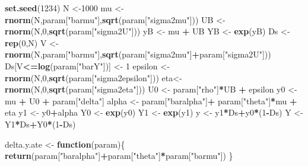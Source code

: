 \documentclass[]{book}
\newenvironment{Shaded}{\begin{snugshade}}{\end{snugshade}}
\newcommand{\ControlFlowTok}[1]{\textcolor[rgb]{0.13,0.29,0.53}{\textbf{#1}}}
\newcommand{\DecValTok}[1]{\textcolor[rgb]{0.00,0.00,0.81}{#1}}
\newcommand{\KeywordTok}[1]{\textcolor[rgb]{0.13,0.29,0.53}{\textbf{#1}}}
\newcommand{\NormalTok}[1]{#1}
\newcommand{\OperatorTok}[1]{\textcolor[rgb]{0.81,0.36,0.00}{\textbf{#1}}}
\newcommand{\StringTok}[1]{\textcolor[rgb]{0.31,0.60,0.02}{#1}}
\theoremstyle{definition}
\theoremstyle{definition}
\theoremstyle{definition}
\theoremstyle{remark}
\begin{document}
\begin{Shaded}
\begin{Highlighting}[]
\KeywordTok{set.seed}\NormalTok{(}\DecValTok{1234}\NormalTok{)}
\NormalTok{N <-}\DecValTok{1000}
\NormalTok{mu <-}\StringTok{ }\KeywordTok{rnorm}\NormalTok{(N,param[}\StringTok{"barmu"}\NormalTok{],}\KeywordTok{sqrt}\NormalTok{(param[}\StringTok{"sigma2mu"}\NormalTok{]))}
\NormalTok{UB <-}\StringTok{ }\KeywordTok{rnorm}\NormalTok{(N,}\DecValTok{0}\NormalTok{,}\KeywordTok{sqrt}\NormalTok{(param[}\StringTok{"sigma2U"}\NormalTok{]))}
\NormalTok{yB <-}\StringTok{ }\NormalTok{mu }\OperatorTok{+}\StringTok{ }\NormalTok{UB }
\NormalTok{YB <-}\StringTok{ }\KeywordTok{exp}\NormalTok{(yB)}
\NormalTok{Ds <-}\StringTok{ }\KeywordTok{rep}\NormalTok{(}\DecValTok{0}\NormalTok{,N)}
\NormalTok{V <-}\StringTok{ }\KeywordTok{rnorm}\NormalTok{(N,param[}\StringTok{"barmu"}\NormalTok{],}\KeywordTok{sqrt}\NormalTok{(param[}\StringTok{"sigma2mu"}\NormalTok{]}\OperatorTok{+}\NormalTok{param[}\StringTok{"sigma2U"}\NormalTok{]))}
\NormalTok{Ds[V}\OperatorTok{<=}\KeywordTok{log}\NormalTok{(param[}\StringTok{"barY"}\NormalTok{])] <-}\StringTok{ }\DecValTok{1} 
\NormalTok{epsilon <-}\StringTok{ }\KeywordTok{rnorm}\NormalTok{(N,}\DecValTok{0}\NormalTok{,}\KeywordTok{sqrt}\NormalTok{(param[}\StringTok{"sigma2epsilon"}\NormalTok{]))}
\NormalTok{eta<-}\StringTok{ }\KeywordTok{rnorm}\NormalTok{(N,}\DecValTok{0}\NormalTok{,}\KeywordTok{sqrt}\NormalTok{(param[}\StringTok{"sigma2eta"}\NormalTok{]))}
\NormalTok{U0 <-}\StringTok{ }\NormalTok{param[}\StringTok{"rho"}\NormalTok{]}\OperatorTok{*}\NormalTok{UB }\OperatorTok{+}\StringTok{ }\NormalTok{epsilon}
\NormalTok{y0 <-}\StringTok{ }\NormalTok{mu }\OperatorTok{+}\StringTok{  }\NormalTok{U0 }\OperatorTok{+}\StringTok{ }\NormalTok{param[}\StringTok{"delta"}\NormalTok{]}
\NormalTok{alpha <-}\StringTok{ }\NormalTok{param[}\StringTok{"baralpha"}\NormalTok{]}\OperatorTok{+}\StringTok{  }\NormalTok{param[}\StringTok{"theta"}\NormalTok{]}\OperatorTok{*}\NormalTok{mu }\OperatorTok{+}\StringTok{ }\NormalTok{eta}
\NormalTok{y1 <-}\StringTok{ }\NormalTok{y0}\OperatorTok{+}\NormalTok{alpha}
\NormalTok{Y0 <-}\StringTok{ }\KeywordTok{exp}\NormalTok{(y0)}
\NormalTok{Y1 <-}\StringTok{ }\KeywordTok{exp}\NormalTok{(y1)}
\NormalTok{y <-}\StringTok{ }\NormalTok{y1}\OperatorTok{*}\NormalTok{Ds}\OperatorTok{+}\NormalTok{y0}\OperatorTok{*}\NormalTok{(}\DecValTok{1}\OperatorTok{-}\NormalTok{Ds)}
\NormalTok{Y <-}\StringTok{ }\NormalTok{Y1}\OperatorTok{*}\NormalTok{Ds}\OperatorTok{+}\NormalTok{Y0}\OperatorTok{*}\NormalTok{(}\DecValTok{1}\OperatorTok{-}\NormalTok{Ds)}

\NormalTok{delta.y.ate <-}\StringTok{ }\ControlFlowTok{function}\NormalTok{(param)\{}
  \KeywordTok{return}\NormalTok{(param[}\StringTok{"baralpha"}\NormalTok{]}\OperatorTok{+}\NormalTok{param[}\StringTok{"theta"}\NormalTok{]}\OperatorTok{*}\NormalTok{param[}\StringTok{"barmu"}\NormalTok{])}
\NormalTok{\}}
\end{Highlighting}
\end{Shaded}
\end{document}

